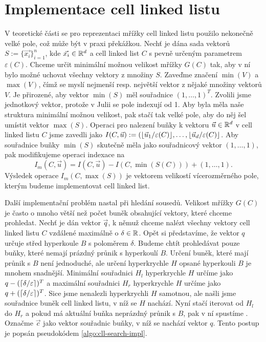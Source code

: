 \section{Implementace cell linked listu}

V teoretické části se pro reprezentaci mřížky cell linked listu použilo nekonečně velké pole, což může být v praxi překážkou. Nechť je dána sada vektorů $S := \{\vec{x_i}\}_{i=1}^n$, kde $\vec{x_i} \in \mathbb{R}^d$ a cell linked list $C$ s pevně určeným parametrem $\varepsilon(C)$. Chceme určit minimální možnou velikost mřížky $G(C)$ tak, aby v ní bylo možné uchovat všechny vektory z množiny $S$. Zaveďme značení $\min(V)$ a $\max(V)$, čímž se myslí nejmenší resp. největší vektor z nějaké množiny vektorů $V$. Je přirozené, aby vektor $\min(S)$ měl souřadnice $(1, \ldots, 1)^T$. Zvolili jsme jednotkový vektor, protože v Julii se pole indexují od 1. Aby byla měla naše struktura minimální možnou velikost, pak stačí tak velké pole, aby do něj šel umístit vektor $\max(S)$. Operaci pro nalezení buňky k vektoru $\vec{u} \in \mathbb{R}^d$ v cell linked listu $C$ jsme zavedli jako $I(C, \vec{u}) := (\lfloor\vec{u}_1/\varepsilon(C)\rfloor, \ldots, \lfloor\vec{u}_d/\varepsilon(C)\rfloor$. Aby souřadnice buňky $\min(S)$ skutečně měla jako souřadnicový vektor $(1, \ldots, 1)$, pak modifikujeme operaci indexace na
\begin{equation}
  \label{cll-index}
  I_m(C, \vec{u}) = I(C, \vec{u}) - I(C, \min(S(C))) + (1, \ldots, 1).
\end{equation}
Výsledek operace $I_m(C, \max(S))$ je vektorem velikostí vícerozměrného pole, kterým budeme implementovat cell linked list.

Další implementační problém nastal při hledání sousedů. Velikost mřížky $G(C)$ je často o mnoho větší než počet buněk obsahující vektory, které chceme prohledat. Nechť je dán vektor $\vec{q}$, k němuž chceme nalézt všechny vektory cell linked listu $C$ vzdálené maximálně o $\delta \in \mathbb{R}$. Opět si představíme, že vektor $q$ určuje střed hyperkoule $B$ s poloměrem $\delta$. Budeme chtít prohledávat pouze buňky, které nemají prázdný průnik s hyperkoulí $B$. Určení buněk, které mají průnik s $B$ není jednoduché, ale určení hyperkrychle $H$ opsané hyperkouli $B$ je mnohem snadnější. Minimální souřadnici $H_l$ hyperkrychle $H$ určíme jako $q - (\lceil\delta/\varepsilon\rceil)^T$ a maximální souřadnici $H_r$ hyperkrychle $H$ určíme jako $q + (\lceil\delta/\varepsilon\rceil)^T$. Sice jsme nenalezli hyperkrychli $H$ samotnou, ale našli jsme souřadnice buněk cell linked listu, v níž se $H$ nachází. Nyní stačí iterovat od $H_l$ do $H_r$ a pokud má aktuální buňka neprázdný průnik s $B$, pak v ní spustíme . Označme $\vec{c}$ jako vektor souřadnic buňky, v níž se nachází vektor $q$. Tento postup je popsán pseudokódem \ref{algo:cll-search-impl}.


